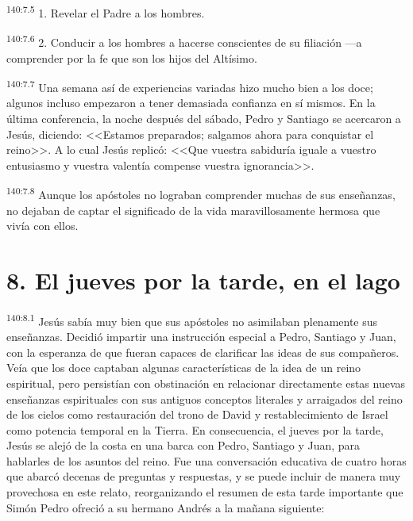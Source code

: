 \par 
\textsuperscript{140:7.5} 1. Revelar el Padre a los hombres.

\par 
\textsuperscript{140:7.6} 2. Conducir a los hombres a hacerse conscientes de su filiación ---a comprender por la fe que son los hijos del Altísimo.

\par 
\textsuperscript{140:7.7} Una semana así de experiencias variadas hizo mucho bien a los doce; algunos incluso empezaron a tener demasiada confianza en sí mismos. En la última conferencia, la noche después del sábado, Pedro y Santiago se acercaron a Jesús, diciendo: <<Estamos preparados; salgamos ahora para conquistar el reino>>. A lo cual Jesús replicó: <<Que vuestra sabiduría iguale a vuestro entusiasmo y vuestra valentía compense vuestra ignorancia>>.

\par 
\textsuperscript{140:7.8} Aunque los apóstoles no lograban comprender muchas de sus enseñanzas, no dejaban de captar el significado de la vida maravillosamente hermosa que vivía con ellos.

\section*{8. El jueves por la tarde, en el lago}
\par 
\textsuperscript{140:8.1} Jesús sabía muy bien que sus apóstoles no asimilaban plenamente sus enseñanzas. Decidió impartir una instrucción especial a Pedro, Santiago y Juan, con la esperanza de que fueran capaces de clarificar las ideas de sus compañeros. Veía que los doce captaban algunas características de la idea de un reino espiritual, pero persistían con obstinación en relacionar directamente estas nuevas enseñanzas espirituales con sus antiguos conceptos literales y arraigados del reino de los cielos como restauración del trono de David y restablecimiento de Israel como potencia temporal en la Tierra. En consecuencia, el jueves por la tarde, Jesús se alejó de la costa en una barca con Pedro, Santiago y Juan, para hablarles de los asuntos del reino. Fue una conversación educativa de cuatro horas que abarcó decenas de preguntas y respuestas, y se puede incluir de manera muy provechosa en este relato, reorganizando el resumen de esta tarde importante que Simón Pedro ofreció a su hermano Andrés a la mañana siguiente:

